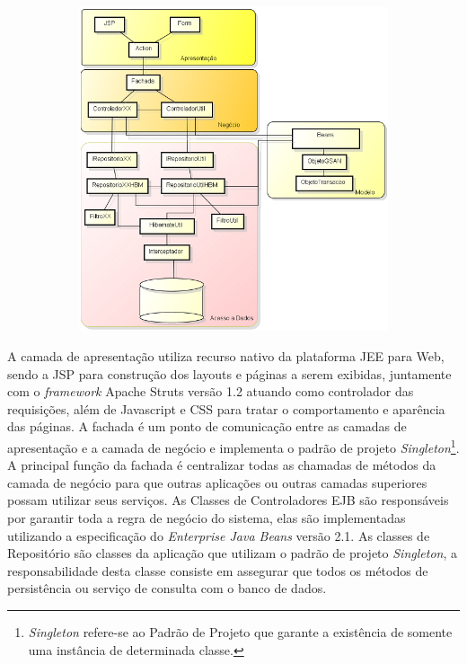 \begin{figure}[H]
	\centering
	\caption{Arquitetura Detalhada do Sistema GSAN}	
	\label{figura:arquiteturaDetalhada}
	\begin{subfigure}[H]{\textwidth}
		\centering
		\includegraphics{figuras/gsanArquiteturaMenor.png}
	\end{subfigure}
\end{figure}

	
A camada de apresentação utiliza recurso nativo da plataforma JEE para Web, sendo a JSP para construção dos layouts e páginas a serem exibidas, juntamente com o \textit{framework} Apache Struts versão 1.2 atuando como controlador das requisições, além de Javascript e CSS para tratar o comportamento e aparência das páginas.
A fachada é um ponto de comunicação entre as camadas de apresentação e a camada de negócio e implementa o padrão de projeto \textit{Singleton}\footnote{\textit{Singleton} refere-se ao Padrão de Projeto que garante a existência de somente uma instância de determinada classe.}. 
A principal função da fachada é centralizar todas as chamadas de métodos da camada de negócio para que outras aplicações ou outras camadas superiores possam utilizar seus serviços.
As Classes de Controladores EJB são responsáveis por garantir toda a regra de negócio do sistema, elas são implementadas utilizando a especificação do \textit{Enterprise Java Beans} versão 2.1.
As classes de Repositório são classes da aplicação que utilizam o padrão de projeto \textit{Singleton}, a responsabilidade desta classe consiste em assegurar que todos os métodos de persistência ou serviço de consulta com o banco de dados.


